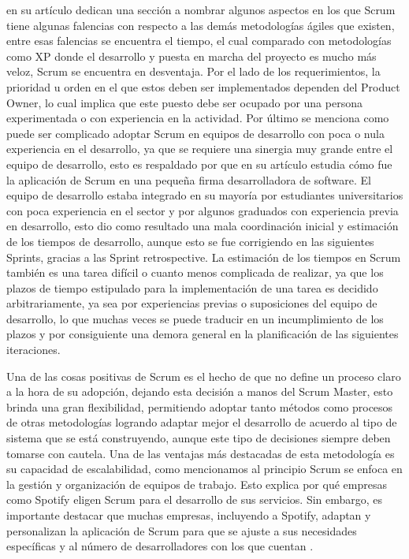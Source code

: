 \documentclass[a4paper,10pt]{article}
\begin{document}
	\textcite{rodriguez2015que} en su artículo dedican una sección a nombrar algunos aspectos en los que Scrum tiene algunas falencias con respecto a las demás metodologías ágiles que existen, entre esas falencias se encuentra el tiempo, el cual comparado con metodologías como XP donde el desarrollo y puesta en marcha del proyecto es mucho más veloz,  Scrum se encuentra en desventaja.  Por el lado de los requerimientos, la prioridad u orden en el que estos deben ser implementados dependen del Product Owner, lo cual implica que este puesto debe ser ocupado por una persona experimentada o con experiencia en la actividad. Por último se menciona como puede ser complicado adoptar Scrum en equipos de desarrollo con poca o nula experiencia en el desarrollo, ya que se requiere una sinergia muy grande entre el equipo de desarrollo, esto es respaldado por \textcite{barrios2012scrum} que en su artículo estudia cómo fue la aplicación de Scrum en una pequeña firma desarrolladora de software. El equipo de desarrollo estaba integrado en su mayoría por estudiantes universitarios con poca experiencia en el sector y por algunos graduados con experiencia previa en desarrollo, esto dio como resultado una mala coordinación inicial y estimación de los tiempos de desarrollo, aunque esto se fue corrigiendo en las siguientes Sprints, gracias a las Sprint retrospective. La estimación de los tiempos en Scrum también es una tarea difícil o cuanto menos complicada de realizar, ya que los plazos de tiempo estipulado para la implementación de una tarea es decidido arbitrariamente, ya sea por experiencias previas o suposiciones del equipo de desarrollo, lo que muchas veces se puede traducir en un incumplimiento de los plazos y por consiguiente una demora general en la planificación de las siguientes iteraciones.
	
	Una de las cosas positivas de Scrum es el hecho de que no define un proceso claro a la hora de su adopción, dejando esta decisión a manos del Scrum Master, esto brinda una gran flexibilidad, permitiendo adoptar tanto métodos como procesos de otras metodologías logrando adaptar mejor el desarrollo de acuerdo al tipo de sistema que se está construyendo, aunque este tipo de decisiones siempre deben tomarse con cautela. Una de las ventajas más destacadas de esta metodología es su capacidad de escalabilidad, como mencionamos al principio Scrum se enfoca en la gestión y organización de equipos de trabajo. Esto explica por qué empresas como Spotify eligen Scrum para el desarrollo de sus servicios. Sin embargo, es importante destacar que muchas empresas, incluyendo a Spotify, adaptan y personalizan la aplicación de Scrum para que se ajuste a sus necesidades específicas y al número de desarrolladores con los que cuentan \parencite{kniberg2012scaling}.
\end{document}
